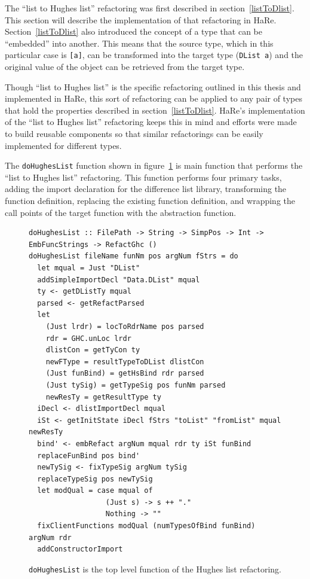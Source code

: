The ``list to Hughes list'' refactoring was first described in section~\ref{listToDlist}. This section will describe the implementation of that refactoring in HaRe. Section~\ref{listToDlist} also introduced the concept of a type that can be ``embedded'' into another. This means that the source type, which in this particular case is \texttt{[a]}, can be transformed into the target type (\texttt{DList a}) and the original value of the object can be retrieved from the target type.

Though ``list to Hughes list'' is the specific refactoring outlined in this thesis and implemented in HaRe, this sort of refactoring can be applied to any pair of types that hold the properties described in section~\ref{listToDlist}. HaRe's implementation of the ``list to Hughes list'' refactoring keeps this in mind and efforts were made to build reusable components so that similar refactorings can be easily implemented for different types.

The \texttt{doHughesList} function shown in figure~\ref{doHughesList} is main function that performs the ``list to Hughes list'' refactoring. This function performs four primary tasks, adding the import declaration for the difference list library, transforming the function definition, replacing the existing function definition, and wrapping the call points of the target function with the abstraction function.

\begin{figure}[t]
\begin{lstlisting}
doHughesList :: FilePath -> String -> SimpPos -> Int -> EmbFuncStrings -> RefactGhc ()
doHughesList fileName funNm pos argNum fStrs = do
  let mqual = Just "DList"
  addSimpleImportDecl "Data.DList" mqual
  ty <- getDListTy mqual
  parsed <- getRefactParsed
  let
    (Just lrdr) = locToRdrName pos parsed
    rdr = GHC.unLoc lrdr
    dlistCon = getTyCon ty
    newFType = resultTypeToDList dlistCon 
    (Just funBind) = getHsBind rdr parsed
    (Just tySig) = getTypeSig pos funNm parsed
    newResTy = getResultType ty
  iDecl <- dlistImportDecl mqual
  iSt <- getInitState iDecl fStrs "toList" "fromList" mqual newResTy
  bind' <- embRefact argNum mqual rdr ty iSt funBind
  replaceFunBind pos bind'
  newTySig <- fixTypeSig argNum tySig
  replaceTypeSig pos newTySig
  let modQual = case mqual of
                  (Just s) -> s ++ "."
                  Nothing -> ""
  fixClientFunctions modQual (numTypesOfBind funBind) argNum rdr
  addConstructorImport
\end{lstlisting}
\caption{\texttt{doHughesList} is the top level function of the Hughes list refactoring.}
\label{doHughesList}
\end{figure}

